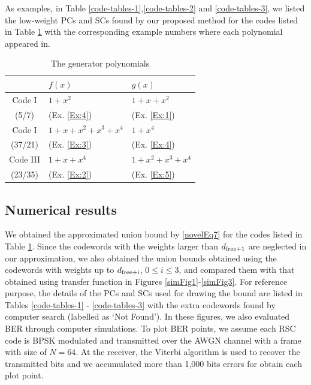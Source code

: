 As examples, in Table \ref{code-tables-1},\ref{code-tables-2} and \ref{code-tables-3}, we listed the low-weight PCs and SCs found by our proposed method for the codes listed in Table \ref{TB:Codes} with the corresponding example numbers where each polynomial appeared in.
\begin{table}[htbp]
	\caption{The generator polynomials}
	\centering
	\begin{tabular}{cll} 
		\toprule
			& $f(x)$ & $g(x)$ \\ %
		\midrule
		Code I & $1+x^2$ & $1+x+x^2$\\
		(5/7) &  (Ex. \ref{Ex:4}) &  (Ex. \ref{Ex:1}) \\\hline
		Code I& $1+x+x^2+x^3+x^4$& $1+x^4$\\
		(37/21) &  (Ex. \ref{Ex:3}) &  (Ex. \ref{Ex:4})\\\hline
		Code III& $1+x+x^4$& $1+x^2+x^3+x^4$\\
		(23/35) &  (Ex. \ref{Ex:2}) &  (Ex. \ref{Ex:5})\\
		\bottomrule
	\end{tabular}
	\label{TB:Codes}
\end{table}

\subsection{Numerical results}

We obtained the approximated union bound by \eqref{novelEq7} for the codes listed in Table \ref{TB:Codes}. Since the codewords with the weights larger than $d_{\rm free+1}$ are neglected in our approximation, we also obtained the union bounds obtained using the codewords with weights up to $d_{\rm free+i}$, $0 \leq i \leq 3$, and compared them with that obtained using transfer function in Figures \ref{simFig1}-\ref{simFig3}.
For reference purpose, the details of the PCs and SCs used for drawing the bound are listed in Tables \ref{code-tables-1} - \ref{code-tables-3} with the extra codewords found by computer search (labelled as `Not Found').
In these figures, we also evaluated BER through computer simulations. To plot BER points, we assume each RSC code is BPSK modulated and transmitted over the AWGN channel with a frame with size of $N=64$. At the receiver, the Viterbi algorithm is used to recover the transmitted bits and we accumulated more than 1,000 bits errors for obtain each plot point.

